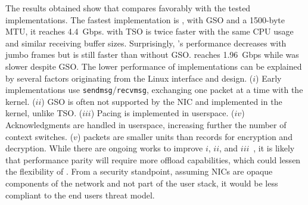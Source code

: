 The results obtained show that \tcpls compares favorably with the tested \quic implementations. The fastest \quic implementation is \quicly, with GSO and a 1500-byte MTU, it reaches 4.4~Gbps. \tcpls with TSO is twice faster with the same CPU usage and similar receiving buffer sizes. Surprisingly, \quicly's performance decreases with jumbo frames but is still faster than without GSO.  \msquic reaches 1.96~Gbps while \mvfst was slower despite GSO.
The lower performance of \quic implementations can be explained by several
factors originating from the Linux \udp interface and \quic design.
($i$) Early \quic implementations use \texttt{sendmsg}/\texttt{recvmsg},
exchanging one packet at a time with the kernel.
($ii$) GSO is often not supported by the NIC and implemented in the kernel,
unlike TSO.
($iii$) Pacing is implemented in userspace.
($iv$) Acknowledgments are handled in userspace, increasing further the number
of context switches.
($v$) \quic packets are smaller units than \tls records for encryption and
decryption.
While there are ongoing works to improve $i$, $ii$, and $iii$~\cite{udp-gso-pacing}, it is likely that performance parity will require more offload capabilities, which could lessen the flexibility of \quic. From a security standpoint, assuming NICs are opaque components of the network and not part of the user stack, it would be less compliant to the end users threat model.

